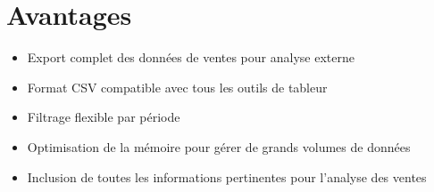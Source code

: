 \documentclass[12pt,a4paper]{article}
\begin{document}
\section{Avantages}
\begin{itemize}
    \item Export complet des données de ventes pour analyse externe
    \item Format CSV compatible avec tous les outils de tableur
    \item Filtrage flexible par période
    \item Optimisation de la mémoire pour gérer de grands volumes de données
    \item Inclusion de toutes les informations pertinentes pour l'analyse des ventes
\end{itemize}
\end{document}
